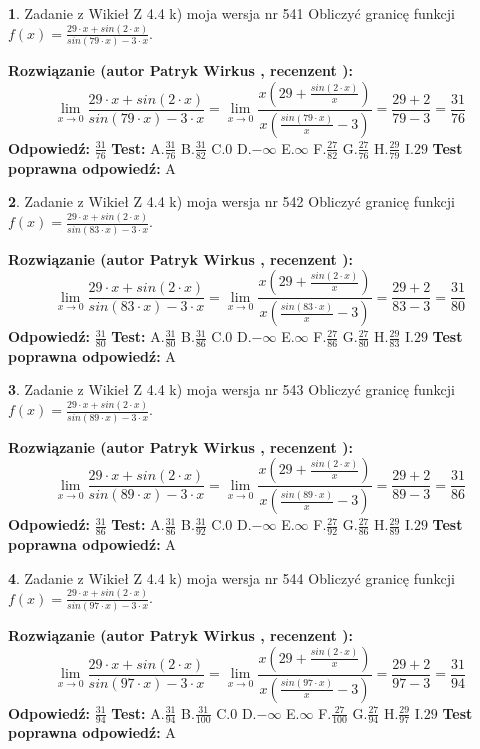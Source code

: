 \documentclass[12pt, a4paper]{article}
\theoremstyle{definition} %
\newtheorem{zad}{}
\newcommand{\zadStart}[1]{\begin{zad}#1\newline}
\newcommand{\zadStop}{\end{zad}}
\newcommand{\rozwStart}[2]{\noindent \textbf{Rozwiązanie (autor #1 , recenzent #2): }\newline}
\newcommand{\rozwStop}{\newline}
\newcommand{\odpStart}{\noindent \textbf{Odpowiedź:}\newline}
\newcommand{\odpStop}{\newline}
\newcommand{\testStart}{\noindent \textbf{Test:}\newline}
\newcommand{\testStop}{\newline}
\newcommand{\kluczStart}{\noindent \textbf{Test poprawna odpowiedź:}\newline}
\newcommand{\kluczStop}{\newline}
\begin{document}
\zadStart{Zadanie z Wikieł Z 4.4 k) moja wersja nr 541}
Obliczyć granicę funkcji $f(x)=\frac{29\cdot x +sin(2\cdot x)}{sin(79\cdot x) -3\cdot x}$.
\zadStop
\rozwStart{Patryk Wirkus}{}
$$\lim\limits_{x\to 0}\frac{29\cdot x +sin(2\cdot x)}{sin(79\cdot x) -3\cdot x}
=\lim\limits_{x\to 0}\frac{x(29+\frac{sin(2\cdot x)}{x})}{x(\frac{sin(79\cdot x)}{x}-3)}
=\frac{29+2}{79-3} = \frac{31}{76}$$
\rozwStop
\odpStart
$\frac{31}{76}$
\odpStop
\testStart
A.$\frac{31}{76}$
B.$\frac{31}{82}$
C.$0$
D.$-\infty$
E.$\infty$
F.$\frac{27}{82}$
G.$\frac{27}{76}$
H.$\frac{29}{79}$
I.$29$
\testStop
\kluczStart
A
\kluczStop



\zadStart{Zadanie z Wikieł Z 4.4 k) moja wersja nr 542}
Obliczyć granicę funkcji $f(x)=\frac{29\cdot x +sin(2\cdot x)}{sin(83\cdot x) -3\cdot x}$.
\zadStop
\rozwStart{Patryk Wirkus}{}
$$\lim\limits_{x\to 0}\frac{29\cdot x +sin(2\cdot x)}{sin(83\cdot x) -3\cdot x}
=\lim\limits_{x\to 0}\frac{x(29+\frac{sin(2\cdot x)}{x})}{x(\frac{sin(83\cdot x)}{x}-3)}
=\frac{29+2}{83-3} = \frac{31}{80}$$
\rozwStop
\odpStart
$\frac{31}{80}$
\odpStop
\testStart
A.$\frac{31}{80}$
B.$\frac{31}{86}$
C.$0$
D.$-\infty$
E.$\infty$
F.$\frac{27}{86}$
G.$\frac{27}{80}$
H.$\frac{29}{83}$
I.$29$
\testStop
\kluczStart
A
\kluczStop



\zadStart{Zadanie z Wikieł Z 4.4 k) moja wersja nr 543}
Obliczyć granicę funkcji $f(x)=\frac{29\cdot x +sin(2\cdot x)}{sin(89\cdot x) -3\cdot x}$.
\zadStop
\rozwStart{Patryk Wirkus}{}
$$\lim\limits_{x\to 0}\frac{29\cdot x +sin(2\cdot x)}{sin(89\cdot x) -3\cdot x}
=\lim\limits_{x\to 0}\frac{x(29+\frac{sin(2\cdot x)}{x})}{x(\frac{sin(89\cdot x)}{x}-3)}
=\frac{29+2}{89-3} = \frac{31}{86}$$
\rozwStop
\odpStart
$\frac{31}{86}$
\odpStop
\testStart
A.$\frac{31}{86}$
B.$\frac{31}{92}$
C.$0$
D.$-\infty$
E.$\infty$
F.$\frac{27}{92}$
G.$\frac{27}{86}$
H.$\frac{29}{89}$
I.$29$
\testStop
\kluczStart
A
\kluczStop



\zadStart{Zadanie z Wikieł Z 4.4 k) moja wersja nr 544}
Obliczyć granicę funkcji $f(x)=\frac{29\cdot x +sin(2\cdot x)}{sin(97\cdot x) -3\cdot x}$.
\zadStop
\rozwStart{Patryk Wirkus}{}
$$\lim\limits_{x\to 0}\frac{29\cdot x +sin(2\cdot x)}{sin(97\cdot x) -3\cdot x}
=\lim\limits_{x\to 0}\frac{x(29+\frac{sin(2\cdot x)}{x})}{x(\frac{sin(97\cdot x)}{x}-3)}
=\frac{29+2}{97-3} = \frac{31}{94}$$
\rozwStop
\odpStart
$\frac{31}{94}$
\odpStop
\testStart
A.$\frac{31}{94}$
B.$\frac{31}{100}$
C.$0$
D.$-\infty$
E.$\infty$
F.$\frac{27}{100}$
G.$\frac{27}{94}$
H.$\frac{29}{97}$
I.$29$
\testStop
\kluczStart
A
\kluczStop
\end{document}
